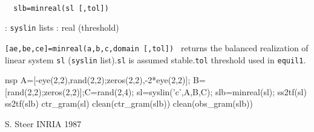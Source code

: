 \begin{mandesc}
   \\ %
\end{mandesc}
\begin{calling_sequence}
\begin{verbatim}
  slb=minreal(sl [,tol])  
\end{verbatim}
\end{calling_sequence}
\begin{parameters}
  \begin{varlist}
    : \verb!syslin! lists
    : real (threshold)
  \end{varlist}
\end{parameters}
\begin{mandescription}
  \verb![ae,be,ce]=minreal(a,b,c,domain [,tol]) !  returns the balanced
  realization of linear system \verb!sl! (\verb!syslin! list).\verb!sl! is
  assumed stable.\verb!tol! threshold used in \verb!equil1!.
\end{mandescription}
\begin{examples}
  \begin{mintednsp}{nsp}
    A=[-eye(2,2),rand(2,2);zeros(2,2),-2*eye(2,2)];
    B=[rand(2,2);zeros(2,2)];C=rand(2,4);
    sl=syslin('c',A,B,C);
    slb=minreal(sl);
    ss2tf(sl)
    ss2tf(slb)
    ctr_gram(sl)
    clean(ctr_gram(slb))
    clean(obs_gram(slb))
  \end{mintednsp}
\end{examples}
\begin{manseealso}
        
\end{manseealso}
\begin{authors}
  S. Steer INRIA 1987
\end{authors}
